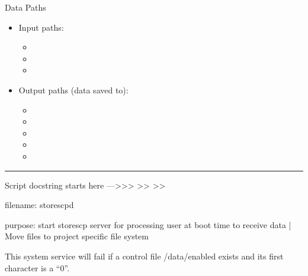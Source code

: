 \documentclass[letterpaper,10pt,english]{sphinxmanual}
\begin{document}

\sphinxAtStartPar
Data Paths
\begin{itemize}
\item {} 
\sphinxAtStartPar
Input paths:
\begin{itemize}
\item {} 
\sphinxAtStartPar
{}

\item {} 
\sphinxAtStartPar
{}

\item {} 
\sphinxAtStartPar
{}

\end{itemize}

\item {} 
\sphinxAtStartPar
Output paths (data saved to):
\begin{itemize}
\item {} 
\sphinxAtStartPar
{}

\item {} 
\sphinxAtStartPar
{}

\item {} 
\sphinxAtStartPar
{}

\item {} 
\sphinxAtStartPar
{}

\item {} 
\sphinxAtStartPar
{}

\end{itemize}

\end{itemize}


\bigskip\hrule\bigskip


\sphinxAtStartPar
Script docstring starts here —\textgreater{}\textgreater{}\textgreater{}
\textendash{}\textgreater{}\textgreater{}
\textendash{}\textgreater{}\textgreater{}

\sphinxAtStartPar
filename: storescpd

\sphinxAtStartPar
purpose: start storescp server for processing user at boot time to receive data
|         Move files to project specific file system

\sphinxAtStartPar
This system service will fail if a control file /data/enabled exists and  its first character is a “0”.
\end{document}
